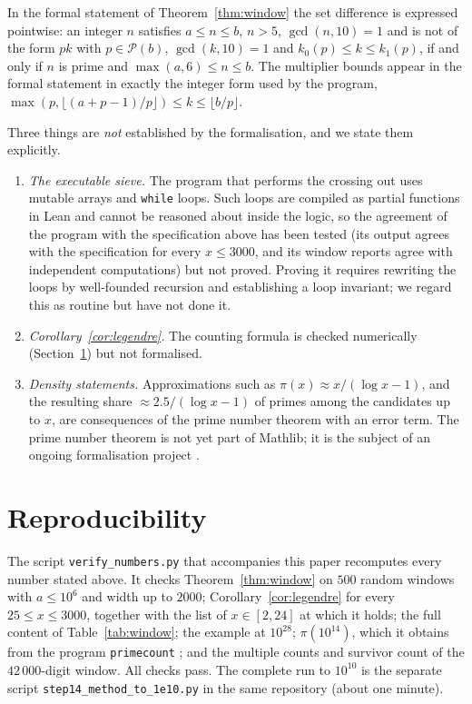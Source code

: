 \documentclass[11pt]{amsart}
\theoremstyle{definition}
\theoremstyle{remark}
\newcommand{\Sv}{\mathcal{P}}
\newcommand{\lean}[1]{\texttt{#1}}
\begin{document}
In the formal statement of Theorem~\ref{thm:window} the set difference is expressed pointwise: an integer $n$ satisfies $a\le n\le b$, $n>5$, $\gcd(n,10)=1$ and is not of the form $pk$ with $p\in\Sv(b)$, $\gcd(k,10)=1$ and $k_0(p)\le k\le k_1(p)$, if and only if $n$ is prime and $\max(a,6)\le n\le b$. The multiplier bounds appear in the formal statement in exactly the integer form used by the program, $\max(p,\lfloor(a+p-1)/p\rfloor)\le k\le\lfloor b/p\rfloor$.

Three things are \emph{not} established by the formalisation, and we state them explicitly.
\begin{enumerate}
\item \emph{The executable sieve.} The program that performs the crossing out uses mutable arrays and \lean{while} loops. Such loops are compiled as partial functions in Lean and cannot be reasoned about inside the logic, so the agreement of the program with the specification above has been tested (its output agrees with the specification for every $x\le 3000$, and its window reports agree with independent computations) but not proved. Proving it requires rewriting the loops by well-founded recursion and establishing a loop invariant; we regard this as routine but have not done it.
\item \emph{Corollary~\ref{cor:legendre}.} The counting formula is checked numerically (Section~\ref{sec:reproduce}) but not formalised.
\item \emph{Density statements.} Approximations such as $\pi(x)\approx x/(\log x-1)$, and the resulting share $\approx 2.5/(\log x-1)$ of primes among the candidates up to $x$, are consequences of the prime number theorem with an error term. The prime number theorem is not yet part of Mathlib; it is the subject of an ongoing formalisation project \cite{PNTplus}.
\end{enumerate}

\section{Reproducibility}\label{sec:reproduce}

The script \texttt{verify\_numbers.py} that accompanies this paper recomputes every number stated above. It checks Theorem~\ref{thm:window} on $500$ random windows with $a\le 10^6$ and width up to $2000$; Corollary~\ref{cor:legendre} for every $25\le x\le 3000$, together with the list of $x\in[2,24]$ at which it holds; the full content of Table~\ref{tab:window}; the example at $10^{28}$; $\pi(10^{14})$, which it obtains from the program \texttt{primecount} \cite{primecount}; and the multiple counts and survivor count of the $42\,000$-digit window. All checks pass. The complete run to $10^{10}$ is the separate script \texttt{step14\_method\_to\_1e10.py} in the same repository (about one minute).
\end{document}
